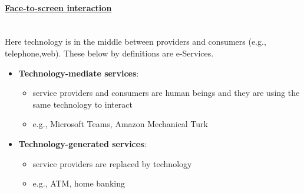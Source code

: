 \documentclass[10pt,a4paper]{article}
\newcommand{\myparagraph}[1]{\paragraph{\uline{#1}}\mbox{}\\[0.05in]}
\begin{document}
\myparagraph{Face-to-screen interaction}
Here technology is in the middle between providers and consumers (e.g., telephone,web). These below by definitions are e-Services.
\begin{itemize}
	\item \textbf{Technology-mediate services}:
	\begin{itemize}
		\item service providers and consumers are human beings and they are using the same technology to interact
		\item e.g., Microsoft Teams, Amazon Mechanical Turk
	\end{itemize}
	\item \textbf{Technology-generated services}:
		\begin{itemize}
		\item service providers are replaced by technology
		\item e.g., ATM, home banking
	\end{itemize}
\end{itemize}
\end{document}
